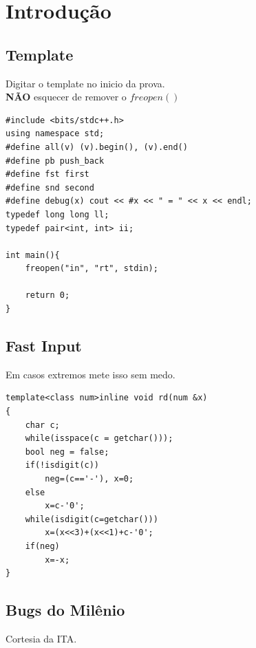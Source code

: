 \chapter{Introdução}

\section{Template}

Digitar o template no inicio da prova. \\
\textbf{NÃO} esquecer de remover o $freopen()$
\begin{multicols}{2}
\begin{lstlisting}
#include <bits/stdc++.h>
using namespace std;
#define all(v) (v).begin(), (v).end()
#define pb push_back
#define fst first
#define snd second
#define debug(x) cout << #x << " = " << x << endl;
typedef long long ll;
typedef pair<int, int> ii;

int main(){
	freopen("in", "rt", stdin);

	return 0;
}
\end{lstlisting}
\end{multicols}

\section{Fast Input}

Em casos extremos mete isso sem medo. 
\begin{multicols}{2}
\begin{lstlisting}
template<class num>inline void rd(num &x)
{
	char c;
	while(isspace(c = getchar()));
	bool neg = false;
	if(!isdigit(c))
		neg=(c=='-'), x=0;
	else
		x=c-'0';
	while(isdigit(c=getchar()))
		x=(x<<3)+(x<<1)+c-'0';
	if(neg)
		x=-x;
}
\end{lstlisting}
\end{multicols}

\section{Bugs do Milênio}

Cortesia da ITA. \\

